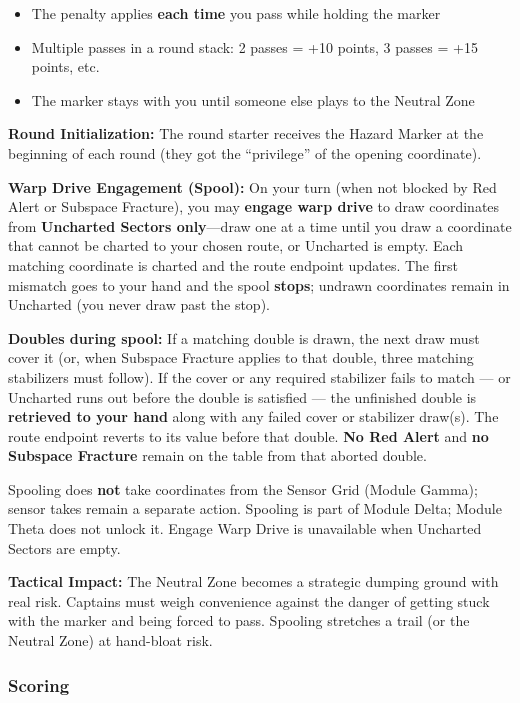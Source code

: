 \documentclass[11pt]{article}
\providecommand{\tightlist}{%
  \setlength{\itemsep}{0pt}\setlength{\parskip}{0pt}}
\begin{document}
\begin{itemize}
\tightlist
\item
  The penalty applies \textbf{each time} you pass while holding the
  marker
\item
  Multiple passes in a round stack: 2 passes = +10 points, 3 passes =
  +15 points, etc.
\item
  The marker stays with you until someone else plays to the Neutral Zone
\end{itemize}

\textbf{Round Initialization:} The round starter receives the Hazard
Marker at the beginning of each round (they got the ``privilege'' of the
opening coordinate).

\textbf{Warp Drive Engagement (Spool):} On your turn (when not blocked by
Red Alert or Subspace Fracture), you may \textbf{engage warp drive} to
draw coordinates from \textbf{Uncharted Sectors only}---draw one at a
time until you draw a coordinate that cannot be charted to your chosen
route, or Uncharted is empty. Each matching coordinate is charted and
the route endpoint updates. The first mismatch goes to your hand and the
spool \textbf{stops}; undrawn coordinates remain in Uncharted (you never
draw past the stop).

\textbf{Doubles during spool:} If a matching double is drawn, the next
draw must cover it (or, when Subspace Fracture applies to that double,
three matching stabilizers must follow). If the cover or any required
stabilizer fails to match --- or Uncharted runs out before the double is
satisfied --- the unfinished double is \textbf{retrieved to your hand}
along with any failed cover or stabilizer draw(s). The route endpoint
reverts to its value before that double. \textbf{No Red Alert} and
\textbf{no Subspace Fracture} remain on the table from that aborted
double.

Spooling does \textbf{not} take coordinates from the Sensor Grid (Module
Gamma); sensor takes remain a separate action. Spooling is part of Module
Delta; Module Theta does not unlock it. Engage Warp Drive is unavailable
when Uncharted Sectors are empty.

\textbf{Tactical Impact:} The Neutral Zone becomes a strategic dumping
ground with real risk. Captains must weigh convenience against the
danger of getting stuck with the marker and being forced to pass.
Spooling stretches a trail (or the Neutral Zone) at hand-bloat risk.

\subsubsection{Scoring}\label{scoring}
\end{document}
